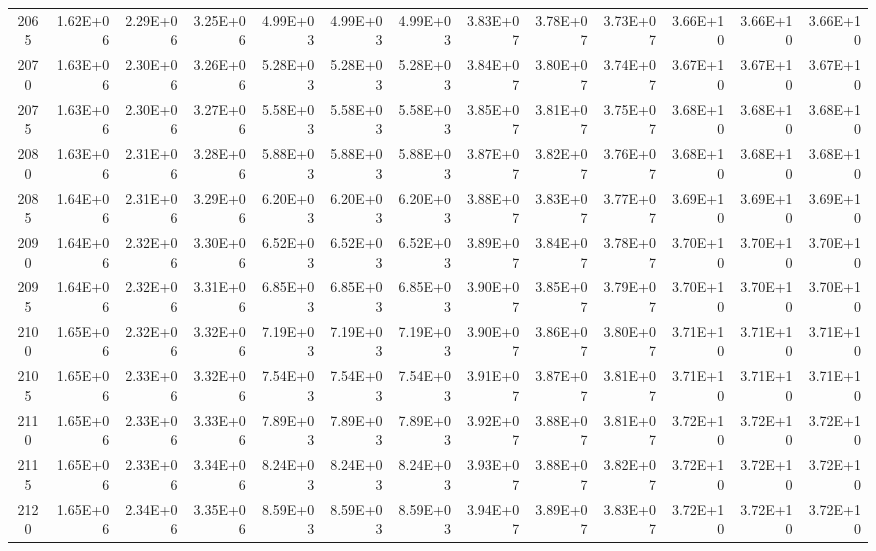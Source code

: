 \documentclass{article}
\begin{document}
\begin{table}
\begin{tabular}{crrr|rrr|rrr|rrr}
2065     & 1.62E+06   & 2.29E+06   & 3.25E+06   & 4.99E+03   & 4.99E+03   & 4.99E+03   & 3.83E+07   & 3.78E+07   & 3.73E+07   & 3.66E+10   & 3.66E+10   & 3.66E+10   \\
2070     & 1.63E+06   & 2.30E+06   & 3.26E+06   & 5.28E+03   & 5.28E+03   & 5.28E+03   & 3.84E+07   & 3.80E+07   & 3.74E+07   & 3.67E+10   & 3.67E+10   & 3.67E+10   \\
2075     & 1.63E+06   & 2.30E+06   & 3.27E+06   & 5.58E+03   & 5.58E+03   & 5.58E+03   & 3.85E+07   & 3.81E+07   & 3.75E+07   & 3.68E+10   & 3.68E+10   & 3.68E+10   \\
2080     & 1.63E+06   & 2.31E+06   & 3.28E+06   & 5.88E+03   & 5.88E+03   & 5.88E+03   & 3.87E+07   & 3.82E+07   & 3.76E+07   & 3.68E+10   & 3.68E+10   & 3.68E+10   \\
2085     & 1.64E+06   & 2.31E+06   & 3.29E+06   & 6.20E+03   & 6.20E+03   & 6.20E+03   & 3.88E+07   & 3.83E+07   & 3.77E+07   & 3.69E+10   & 3.69E+10   & 3.69E+10   \\
2090     & 1.64E+06   & 2.32E+06   & 3.30E+06   & 6.52E+03   & 6.52E+03   & 6.52E+03   & 3.89E+07   & 3.84E+07   & 3.78E+07   & 3.70E+10   & 3.70E+10   & 3.70E+10   \\
2095     & 1.64E+06   & 2.32E+06   & 3.31E+06   & 6.85E+03   & 6.85E+03   & 6.85E+03   & 3.90E+07   & 3.85E+07   & 3.79E+07   & 3.70E+10   & 3.70E+10   & 3.70E+10   \\
2100     & 1.65E+06   & 2.32E+06   & 3.32E+06   & 7.19E+03   & 7.19E+03   & 7.19E+03   & 3.90E+07   & 3.86E+07   & 3.80E+07   & 3.71E+10   & 3.71E+10   & 3.71E+10   \\
2105     & 1.65E+06   & 2.33E+06   & 3.32E+06   & 7.54E+03   & 7.54E+03   & 7.54E+03   & 3.91E+07   & 3.87E+07   & 3.81E+07   & 3.71E+10   & 3.71E+10   & 3.71E+10   \\
2110     & 1.65E+06   & 2.33E+06   & 3.33E+06   & 7.89E+03   & 7.89E+03   & 7.89E+03   & 3.92E+07   & 3.88E+07   & 3.81E+07   & 3.72E+10   & 3.72E+10   & 3.72E+10   \\
2115     & 1.65E+06   & 2.33E+06   & 3.34E+06   & 8.24E+03   & 8.24E+03   & 8.24E+03   & 3.93E+07   & 3.88E+07   & 3.82E+07   & 3.72E+10   & 3.72E+10   & 3.72E+10   \\
2120     & 1.65E+06   & 2.34E+06   & 3.35E+06   & 8.59E+03   & 8.59E+03   & 8.59E+03   & 3.94E+07   & 3.89E+07   & 3.83E+07   & 3.72E+10   & 3.72E+10   & 3.72E+10  
\end{tabular} 
\end{table}
\end{document}

